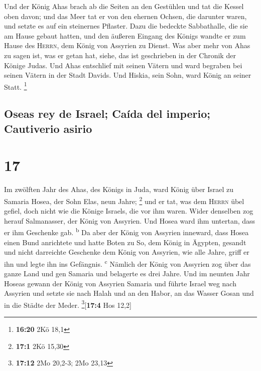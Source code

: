  Und der König Ahas brach ab die Seiten an den Gestühlen
und tat die Kessel oben davon; und das Meer tat er von den ehernen
Ochsen, die darunter waren, und setzte es auf ein steinernes Pflaster.
 Dazu die bedeckte Sabbathalle, die sie am Hause gebaut
hatten, und den äußeren Eingang des Königs wandte er zum Hause des
\textsc{Herrn}, dem König von Assyrien zu Dienst.  Was
aber mehr von Ahas zu sagen ist, was er getan hat, siehe, das ist
geschrieben in der Chronik der Könige Judas.  Und Ahas
entschlief mit seinen Vätern und ward begraben bei seinen Vätern in der
Stadt Davids. Und Hiskia, sein Sohn, ward König an seiner Statt.
\footnote{\textbf{16:20} 2Kö 18,1}

\hypertarget{oseas-rey-de-israel-cauxedda-del-imperio-cautiverio-asirio}{%
\subsection{Oseas rey de Israel; Caída del imperio; Cautiverio
asirio}\label{oseas-rey-de-israel-cauxedda-del-imperio-cautiverio-asirio}}

\hypertarget{section-16}{%
\section{17}\label{section-16}}

 Im zwölften Jahr des Ahas, des Königs in Juda, ward König
über Israel zu Samaria Hosea, der Sohn Elas, neun Jahre; \footnote{\textbf{17:1}
  2Kö 15,30}  und er tat, was dem \textsc{Herrn} übel
gefiel, doch nicht wie die Könige Israels, die vor ihm waren.
 Wider denselben zog herauf Salmanasser, der König von
Assyrien. Und Hosea ward ihm untertan, dass er ihm Geschenke gab.
\textsuperscript{b}  Da aber der König von Assyrien
inneward, dass Hosea einen Bund anrichtete und hatte Boten zu So, dem
König in Ägypten, gesandt und nicht darreichte Geschenke dem König von
Assyrien, wie alle Jahre, griff er ihn und legte ihn ins Gefängnis.
\textsuperscript{c}  Nämlich der König von Assyrien zog
über das ganze Land und gen Samaria und belagerte es drei Jahre.
 Und im neunten Jahr Hoseas gewann der König von Assyrien
Samaria und führte Israel weg nach Assyrien und setzte sie nach Halah
und an den Habor, an das Wasser Gosan und in die Städte der Meder.
\footnote{\textbf{17:12} 2Mo 20,2-3; 2Mo 23,13}{[}\textbf{17:4} Hos
12,2{]}

